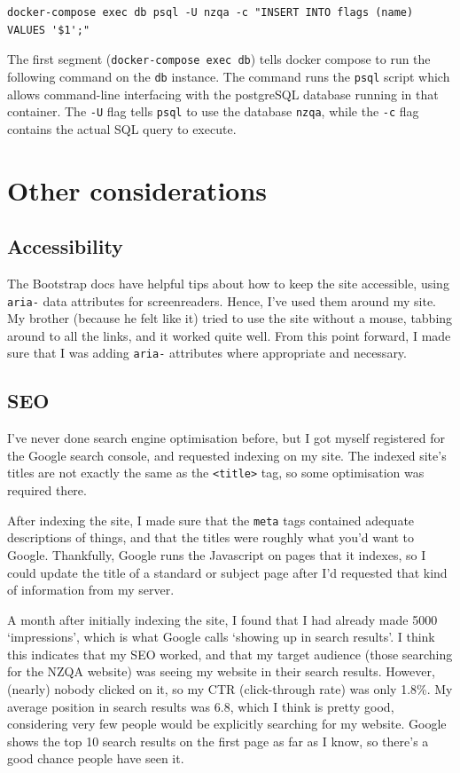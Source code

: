 \documentclass{article}
\begin{document}
\begin{verbatim}
docker-compose exec db psql -U nzqa -c "INSERT INTO flags (name) VALUES '$1';"
\end{verbatim}

The first segment (\texttt{docker-compose exec db}) tells docker compose to run the following command on the \texttt{db} instance. The command runs the \texttt{psql} script which allows command-line interfacing with the postgreSQL database running in that container. The \texttt{-U} flag tells \texttt{psql} to use the database \texttt{nzqa}, while the \texttt{-c} flag contains the actual SQL query to execute.

\section{Other considerations}

\subsection*{Accessibility}
The Bootstrap docs have helpful tips about how to keep the site accessible, using \texttt{aria-} data attributes for screenreaders. Hence, I've used them around my site. My brother (because he felt like it) tried to use the site without a mouse, tabbing around to all the links, and it worked quite well. From this point forward, I made sure that I was adding \texttt{aria-} attributes where appropriate and necessary.

\subsection*{SEO}
I've never done search engine optimisation before, but I got myself registered for the Google search console, and requested indexing on my site. The indexed site's titles are not exactly the same as the \texttt{<title>} tag, so some optimisation was required there.

After indexing the site, I made sure that the \texttt{meta} tags contained adequate descriptions of things, and that the titles were roughly what you'd want to Google. Thankfully, Google runs the Javascript on pages that it indexes, so I could update the title of a standard or subject page after I'd requested that kind of information from my server.

A month after initially indexing the site, I found that I had already made 5000 `impressions', which is what Google calls `showing up in search results'. I think this indicates that my SEO worked, and that my target audience (those searching for the NZQA website) was seeing my website in their search results. However, (nearly) nobody clicked on it, so my CTR (click-through rate) was only 1.8\%. My average position in search results was 6.8, which I think is pretty good, considering very few people would be explicitly searching for my website. Google shows the top 10 search results on the first page as far as I know, so there's a good chance people have seen it.
\end{document}
